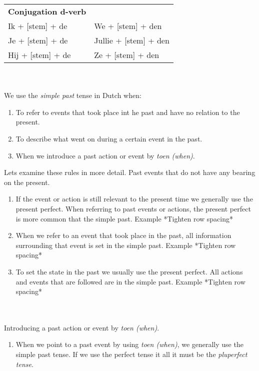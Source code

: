 \documentclass[letterpaper,11pt]{article}
\begin{document}
\begin{tabular}[t]{l l}
    \textbf{Conjugation d-verb} \\
    Ik + [stem] + de &  We + [stem] + den \\
    Je + [stem] + de &  Jullie + [stem] + den \\
    Hij + [stem] + de & Ze + [stem] + den \\
\end{tabular}
\\ \\
We use the \textit{simple past} tense in Dutch when:
\begin{enumerate}
    \item To refer to events that took place int he past and have no relation to
        the present.
    \item To describe what went on during a certain event in the past.
    \item When we introduce a past action or event by \textit{toen (when)}.
\end{enumerate}
\par{Lets examine these rules in more detail.}
Past events that do not have any bearing on the present.
\begin{enumerate}
    \item If the event or action is still relevant to the present time we
        generally use the present perfect. When referring to past events or
        actions, the present perfect is more common that the simple past.
        \subitem Example *Tighten row spacing*
    \item When we refer to an event that took place in the past, all information
        surrounding that event is set in the simple past.
        \subitem Example *Tighten row spacing*
    \item To set the state in the past we usually use the present perfect. All
        actions and events that are followed are in the simple past.
        \subitem Example *Tighten row spacing*
\end{enumerate}
\\ \\ 
Introducing a past action or event by \textit{toen (when)}.
\begin{enumerate}
    \item When we point to a past event by using \textit{toen (when)}, we
        generally use the simple past tense. If we use the perfect tense it all
        it must be the \textit{pluperfect tense}.
\end{enumerate}
\end{document}
